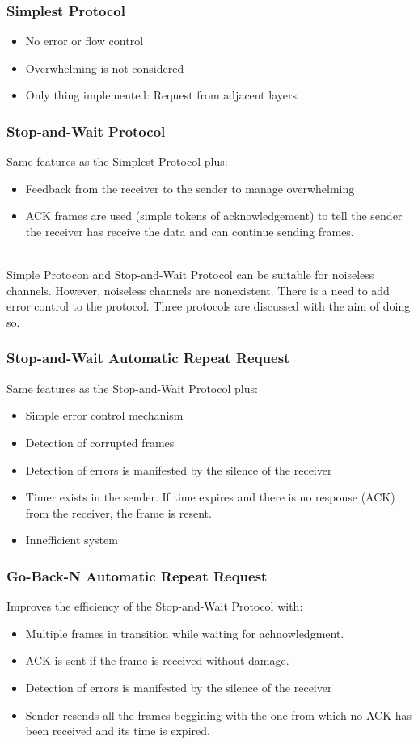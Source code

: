 \subsubsection{Simplest Protocol}
\begin{itemize}
\item No error or flow control
\item Overwhelming is not considered
\item Only thing implemented: Request from adjacent layers.
\end{itemize}
\subsubsection{Stop-and-Wait Protocol}
Same features as the Simplest Protocol plus:
\begin{itemize}
\item Feedback from the receiver to the sender to manage overwhelming
\item ACK frames are used (simple tokens of acknowledgement) to tell the sender the receiver has receive the data and can continue sending frames.
\end{itemize}
\\
Simple Protocon and Stop-and-Wait Protocol can be suitable for noiseless channels. However, noiseless channels are nonexistent. There is a need to add error control to the protocol. Three protocols are discussed with the aim of doing so.
\subsubsection{Stop-and-Wait Automatic Repeat Request}
Same features as the Stop-and-Wait Protocol plus:
\begin{itemize}
\item Simple error control mechanism
\item Detection of corrupted frames
\item Detection of errors is manifested by the silence of the receiver
\item Timer exists in the sender. If time expires and there is no response (ACK) from the receiver, the frame is resent.
\item Innefficient system
\end{itemize}  
\subsubsection{Go-Back-N Automatic Repeat Request}
Improves the efficiency of the Stop-and-Wait Protocol with:
\begin{itemize}
\item Multiple frames in transition while waiting for achnowledgment.
\item ACK is sent if the frame is received without damage.
\item Detection of errors is manifested by the silence of the receiver
\item Sender resends all the frames beggining with the one from which no ACK has been received and its time is expired.
\end{itemize}
